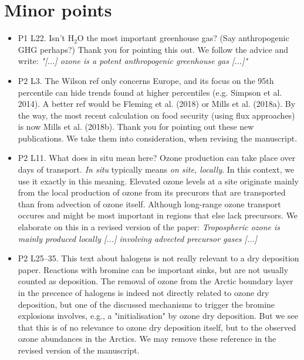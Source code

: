 \documentclass{scrartcl}
\begin{document}
\section{Minor points}
\begin{itemize}
\item {\color{blue}P1 L22. Isn’t $\mathrm{H_2O}$ the most important greenhouse gas? (Say anthropogenic
  GHG perhaps?)}
  Thank you for pointing this out. We follow the advice and write: \emph{"[...] ozone is a potent anthropogenic greenhouse gas [...]"}
\item {\color{blue}P2 L3. The Wilson ref only concerns Europe, and its focus on the 95th percentile can hide trends
  found at higher percentiles (e.g. Simpson et al. 2014). A better ref would be Fleming et al. (2018) or Mills et al. (2018a). By the way, the most recent calculation on food security (using flux approaches) is now Mills et al. (2018b).}
  Thank you for pointing out these new publications. We take them into consideration, when revising the manuscript.
\item {\color{blue}P2 L11. What does in situ mean here? Ozone production can take place over
  days of transport.}
  \emph{In situ} typically means \emph{on site, locally}. In this context, we use it exactly in this meaning. Elevated ozone levels at a site originate mainly from the local production of ozone from its precurors that are transported than from advection of ozone itself. Although long-range ozone transport occures and might be most important in regions that else lack precursors. We elaborate on this in a revised version of the paper: \emph{Tropospheric ozone is mainly produced locally [...] involving advected precursor gases [...]}
\item {\color{blue}P2 L25--35. This text about halogens is not really relevant to a dry deposition
paper. Reactions with bromine can be important sinks, but are not usually counted
as deposition.}
  The removal of ozone from the Arctic boundary layer in the precence of halogens is indeed not directly related to ozone dry deposition, but one of the discussed mechanisms to trigger the bromine explosions involves, e.g., a "initialisation" by ozone dry deposition. But we see that this is of no relevance to ozone dry deposition itself, but to the observed ozone abundances in the Arctics. We may remove these reference in the revised version of the manuscript.
  

\end{itemize}
\end{document}
